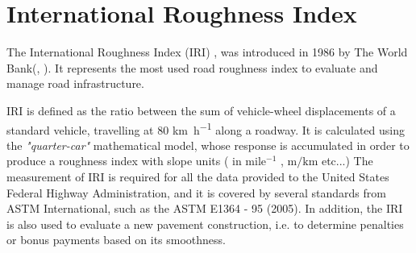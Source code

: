 \documentclass[tesi]{subfiles}
\begin{document}
	\chapter{International Roughness Index}
\label{ch:IRI}
The International Roughness Index (IRI) \cite{sayers1986guidelines}, was introduced in 1986 by The World Bank(\cite{sayers1986guidelines}, \cite{sayers1986international}). It represents the most used road roughness index to evaluate and manage road infrastructure. 


IRI is defined as the ratio between the sum of vehicle-wheel displacements of a standard vehicle, travelling at \num{80} \si{\km\per\hour} along a roadway\cite{sayers1995calculation}. It is calculated using the \textit{"quarter-car"} mathematical model, whose response is accumulated in order to produce a roughness index\cite{little_book} with slope units ( in  mile$^{-1}$ , $\si{\meter\per\km}$  etc...) 
The measurement of IRI is required for all the data provided to the United States Federal Highway Administration, and it is covered by several standards from ASTM International, such as the ASTM E1364 - 95 (2005)\cite{astm2}. In addition, the IRI is also used to evaluate a new pavement construction, i.e. to determine penalties or bonus payments based on its smoothness.
\end{document}
